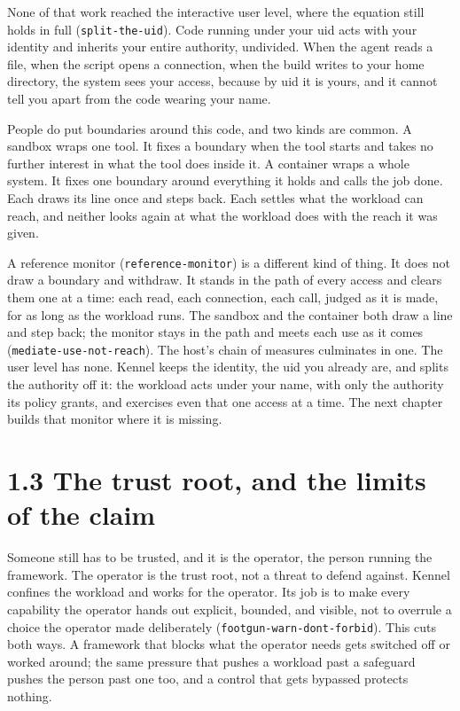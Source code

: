 None of that work reached the interactive user level, where the equation
still holds in full (\texttt{split-the-uid}). Code running under your
uid acts with your identity and inherits your entire authority,
undivided. When the agent reads a file, when the script opens a
connection, when the build writes to your home directory, the system
sees your access, because by uid it is yours, and it cannot tell you
apart from the code wearing your name.

People do put boundaries around this code, and two kinds are common. A
sandbox wraps one tool. It fixes a boundary when the tool starts and
takes no further interest in what the tool does inside it. A container
wraps a whole system. It fixes one boundary around everything it holds
and calls the job done. Each draws its line once and steps back. Each
settles what the workload can reach, and neither looks again at what the
workload does with the reach it was given.

A reference monitor (\texttt{reference-monitor}) is a different kind of
thing. It does not draw a boundary and withdraw. It stands in the path
of every access and clears them one at a time: each read, each
connection, each call, judged as it is made, for as long as the workload
runs. The sandbox and the container both draw a line and step back; the
monitor stays in the path and meets each use as it comes
(\texttt{mediate-use-not-reach}). The host's chain of measures
culminates in one. The user level has none. Kennel keeps the identity,
the uid you already are, and splits the authority off it: the workload
acts under your name, with only the authority its policy grants, and
exercises even that one access at a time. The next chapter builds that
monitor where it is missing.

\hypertarget{the-trust-root-and-the-limits-of-the-claim}{%
\section{1.3 The trust root, and the limits of the
claim}\label{the-trust-root-and-the-limits-of-the-claim}}

Someone still has to be trusted, and it is the operator, the person
running the framework. The operator is the trust root, not a threat to
defend against. Kennel confines the workload and works for the operator.
Its job is to make every capability the operator hands out explicit,
bounded, and visible, not to overrule a choice the operator made
deliberately (\texttt{footgun-warn-dont-forbid}). This cuts both ways. A
framework that blocks what the operator needs gets switched off or
worked around; the same pressure that pushes a workload past a safeguard
pushes the person past one too, and a control that gets bypassed
protects nothing.

